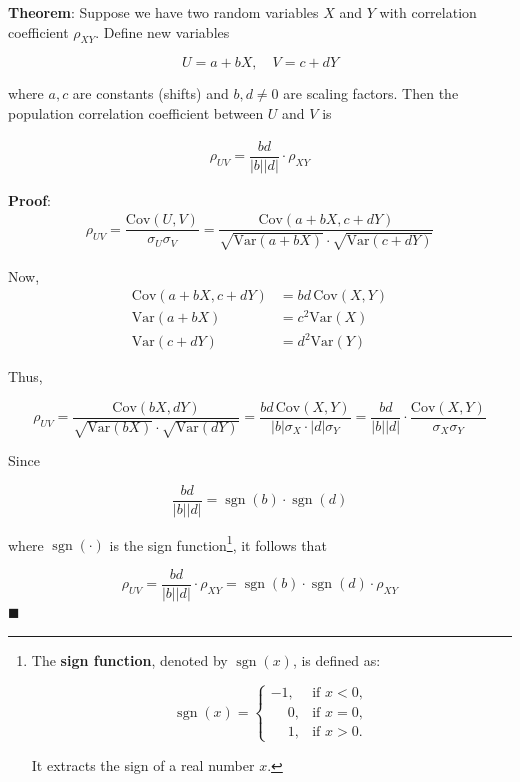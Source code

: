 \documentclass[twoside]{book}
\begin{document}
\begin{textbox}
\textbf{Theorem}: Suppose we have two random variables \(X\) and \(Y\) with correlation coefficient $\rho_{XY}$. Define new variables

\[
U = a + bX, \quad V = c + dY
\]

where \(a, c\) are constants (shifts) and \(b, d \neq 0\) are scaling factors. Then the population correlation coefficient between \(U\) and \(V\) is

\begin{align*}
\rho_{UV} =  \dfrac{bd}{|b||d|} \cdot \rho_{XY}
\end{align*}
\end{textbox}
\textbf{Proof}:
\begin{align*}
\rho_{UV} =  \dfrac{\mathrm{Cov}(U,V)}{\sigma_U \sigma_V} = \dfrac{\mathrm{Cov}(a + bX, c + dY)}{\sqrt{\mathrm{Var}(a + bX)} \cdot \sqrt{\mathrm{Var}(c + dY)}}
\end{align*}

Now,
\begin{align*}
\mathrm{Cov}(a + bX, c + dY) &= bd\, \mathrm{Cov}(X,Y)\\
\mathrm{Var}(a + bX) &= c^2 \mathrm{Var}(X)\\
\mathrm{Var}(c + dY) &= d^2 \mathrm{Var}(Y)
\end{align*}

Thus,

$$\rho_{UV}
= \dfrac{\mathrm{Cov}(bX, dY)}{\sqrt{\mathrm{Var}(bX)}\cdot \sqrt{\mathrm{Var}(dY)}}
= \dfrac{bd \, \mathrm{Cov}(X, Y)}{|b| \sigma_X \cdot |d| \sigma_Y}
= \dfrac{bd}{|b||d|} \cdot \frac{\mathrm{Cov}(X, Y)}{\sigma_X \sigma_Y}$$

Since

\[
\dfrac{bd}{|b||d|} = \operatorname{sgn}(b) \cdot \operatorname{sgn}(d)
\]

where \(\operatorname{sgn}(\cdot)\) is the sign function\footnote{The \textbf{sign function}, denoted by \(\operatorname{sgn}(x)\), is defined as:

	\[
	\operatorname{sgn}(x) =
	\begin{cases}
	-1, & \text{if } x < 0, \\
	\phantom{-}0, & \text{if } x = 0, \\
	\phantom{-}1, & \text{if } x > 0.
	\end{cases}
	\]

	It extracts the sign of a real number \(x\).}, it follows that

\[
\rho_{UV} =  \dfrac{bd}{|b||d|} \cdot \rho_{XY} = \operatorname{sgn}(b) \cdot \operatorname{sgn}(d) \cdot \rho_{XY}
\]
\hfill $\blacksquare$
\end{document}
